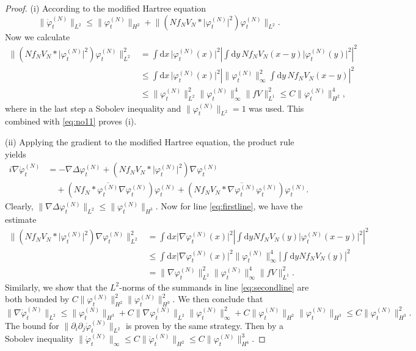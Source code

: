 \documentclass[11pt,a4paper,draft,DIV11]{scrartcl}	%
\newcommand{\di}{\textrm{d}}		%
\newcommand{\cc}[1]{\overline{#1}}	%
\newcommand{\norm}[1]{\lVert#1\rVert}	%
\newcommand{\ph}{\varphi_t^{(N)}}	%
\newcommand{\phdot}{\dot{\varphi}_t^{(N)}}	%
\newcommand{\be}[1]{\begin{equation}\label{eq:#1}}	%
\newcommand{\ee}{\end{equation}}
\newcommand{\eqr}[1]{\eqref{eq:#1}}			%
\begin{document}
\begin{proof}(i) According to the modified Hartree equation
\be{no11}
\norm{\phdot}_{L^2} \leq \norm{\ph}_{H^2} + \norm{\left(N f_N V_N \ast \lvert \ph\rvert^2 \right)\ph}_{L^2}.
\ee
Now we calculate
\begin{align*}
\norm{\left(N f_N V_N \ast \lvert \ph\rvert^2 \right)\ph}_{L^2}^2 & = \int \di x\, \lvert \ph(x)\rvert^2 \left\lvert \int \di y\, N f_NV_N(x-y) \lvert \ph(y)\rvert^2 \right\rvert^2 \\
& \leq \int \di x\, \lvert \ph(x)\rvert^2 \left\lvert \norm{\ph}_\infty^2 \int \di y\, N f_N V_N(x-y) \right\rvert^2 \\
& \leq \norm{\ph}_{L^2}^2 \norm{\ph}_\infty^4 \norm{fV}_{L^1}^2 \leq C \norm{\ph}_{H^2}^4,
\end{align*}
where in the last step a Sobolev inequality and $\norm{\ph}_{L^2} = 1$ was used.
This combined with \eqr{no11} proves (i).

(ii)
Applying the gradient to the modified Hartree equation, the product rule yields
\begin{align}
i \nabla \phdot & = - \nabla \Delta \ph + \left( N f_N V_N \ast \lvert \ph \rvert^2 \right) \nabla \ph \label{eq:firstline}\\
& \quad + \left( N f_N \ast \cc{\ph} \nabla \ph \right) \ph + \left( N f_N V_N \ast \cc{\nabla \ph} \ph \right) \ph. \label{eq:secondline}
\end{align}
Clearly, $\norm{\nabla \Delta \ph}_{L^2} \leq \norm{\ph}_{H^3}$. Now for line \eqref{eq:firstline}, we have the estimate
\begin{align*}
\norm{\left( N f_N V_N \ast \lvert \ph \rvert^2 \right)\nabla \ph}_{L^2}^2 & = \int \di x \lvert \nabla \ph(x)\rvert^2 \left\lvert \int \di y N f_N V_N(y) \lvert\ph(x-y) \rvert^2\right\rvert^2\\
& \leq \int \di x \lvert \nabla \ph(x)\rvert^2 \norm{\ph}_\infty^4 \left\lvert \int \di y N f_N V_N(y) \right\rvert^2 \\
& = \norm{\nabla \ph}_{L^2}^2 \norm{\ph}_\infty^4 \norm{fV}_{L^1}^2. 
\end{align*}
Similarly, we show that the $L^2$-norms of the summands in line \eqref{eq:secondline} are both bounded by $C \norm{\ph}_{H^2}^2 \norm{\ph}_{H^3}^2$. We then conclude that
\[
\norm{\nabla \phdot}_{L^2} \leq \norm{\ph}_{H^3} + C \norm{\nabla \ph}_{L^2} \norm{\ph}_\infty^2 + C \norm{\ph}_{H^2} \norm{\ph}_{H^3} \leq C \norm{\ph}_{H^3}^2.
\]
The bound for $\norm{\partial_i \partial_j \phdot}_{L^2}$ is proven by the same strategy.
Then by a Sobolev inequality $\norm{\phdot}_\infty \leq C \norm{\phdot}_{H^2} \leq C \norm{\ph}_{H^4}^3$.


\end{proof}
\end{document}
